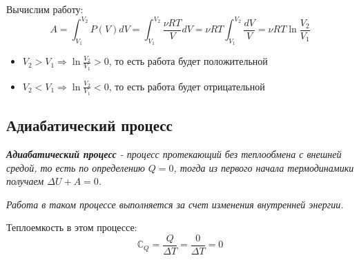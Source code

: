 \begin{center}
\end{center}
Вычислим работу:
\[ A = \int_{V_1}^{V_2}P(V)dV = \int_{V_1}^{V_2}\frac{\nu R T}{V}dV = \nu RT \int_{V_1}^{V_2} \frac{dV}{V}  = \nu RT \ln{\frac{V_2}{V_1}}\]
\begin{itemize}
    \item $V_2 > V_1 \Rightarrow \ln{\frac{V_2}{V_1}} > 0$, то есть работа будет положительной
    \item $V_2 < V_1 \Rightarrow \ln{\frac{V_2}{V_1}} < 0$, то есть работа будет отрицательной
\end{itemize}

\subsection{Адиабатический процесс}
 \textit{\textbf{Адиабатический процесс} - процесс протекающий без теплообмена с внешней средой, то есть по определению $Q = 0$, тогда из первого начала термодинамики получаем $\Delta U + A = 0$. }

\textit{Работа в таком процессе выполняется за счет изменения внутренней энергии.}

\vspace{4px}

Теплоемкость в этом процессе: \[ \mathbb{C}_Q = \frac{Q}{\Delta T} = \frac{0}{\Delta T} = 0 \]

